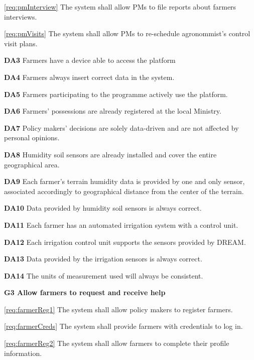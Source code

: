 \documentclass[10pt]{article}
\begin{document}
\begin{description}
\begin{description}
            \item \ref{req:pmInterview} The system shall allow PMs to file reports about farmers interviews.
            \item \ref{req:pmVisits} The system shall allow PMs to re-schedule agronommist's control visit plans.
            \item \textbf{DA3} Farmers have a device able to access the platform
            \item \textbf{DA4} Farmers always insert correct data in the system.
            \item \textbf{DA5} Farmers participating to the programme actively use the platform.
            \item \textbf{DA6} Farmers' possessions are already registered at the local Ministry.
            \item \textbf{DA7} Policy makers' decisions are solely data-driven and are not affected by personal opinions.
            \item \textbf{DA8} Humidity soil sensors are already installed and cover the entire geographical area.
            \item \textbf{DA9} Each farmer's terrain humidity data is provided by one and only sensor, associated accordingly to geographical distance from the center of the terrain.
            \item \textbf{DA10} Data provided by humidity soil sensors is always correct.
            \item \textbf{DA11} Each farmer has an automated irrigation system with a control unit.
            \item \textbf{DA12} Each irrigation control unit supports the sensors provided by DREAM.
            \item \textbf{DA13} Data provided by the irrigation sensors is always correct.
            \item \textbf{DA14} The units of measurement used will always be consistent.
        \end{description}
    \item \textbf{G3 Allow farmers to request and receive help}
        \begin{description}
            \item \ref{req:farmerReg1} The system shall allow policy makers to register farmers.    
            \item \ref{req:farmerCreds} The system shall provide farmers with credentials to log in.    
            \item \ref{req:farmerReg2} The system shall allow farmers to complete their profile information.    

\end{description}
\end{description}
\end{document}
